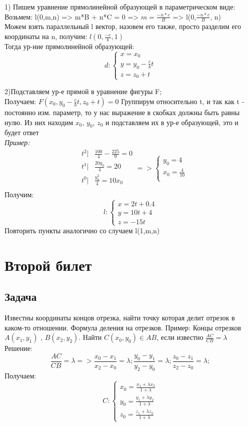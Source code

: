 \documentclass[a4paper,14pt]{extreport} %
\begin{document}
1) Пишем уравнение прямолинейной образующей в параметрическом виде:
Возьмем: l(0,m,n) => m*B + n*C = 0 => $ m = \frac{-n*c}{B} $ => l(0,$\frac{-n*c}{B}$, n)\\ 
Можем взять параллельный l вектор, назовем его также, просто разделим его координаты на n, получим:
$l(0,\frac{-c}{b}, 1)$\\
Тогда ур-ние прямолинейной образующей:
\[
  d:   \begin{cases}
    x = x_0 \\ 
    y = y_0 - \frac{c}{b}t \\ 
    z = z_0 + t
  \end{cases}
\]

2)Подставляем ур-е прямой в уравнение фигуры F; \\
Получаем: $F(x_0, y_0 - \frac{c}{b}t, z_0 + t) = 0$
Группирум относительно t, и так как t - постоянно изм. параметр, то у нас выражение в скобках должны быть равны нулю. 
Из них находим $x_0$, $y_0$, $z_0$ и подставляем их в ур-е образующей, это и будет ответ \\
\textit{Пример:}
\[
\begin{aligned}
  &t^2|   &\frac{100}{4} - \frac{225}{9} = 0\\
  &t^1|   &\frac{20y_0}{4} =20\\
  &t^0|  &\frac{y_0^2}{4} = 10x_0\\
\end{aligned} =>
  \begin{cases}
    y_0=4\\ 
    x_0 = \frac{4}{10}\\
  \end{cases}
\]  
Получим:
\[
  l:\begin{cases}
    x = 2t+0.4\\ 
    y = 10t + 4\\ 
    z = -15t
  \end{cases}
\]
Повторить пункты аналогично со случаем l(1,m,n)

\chapter{Второй билет}

\section*{Задача}
Известны координаты концов отрезка, найти точку которая делит отрезок в каком-то отношении. 
Формула деления на отрезков. 
Пример:
Концы отрезков $ A(x_1, y_1) $ , $ B(x_2, y_2) $. Найти $ C(x_0,y_0) \in AB$, если известно 
$ \frac{AC}{CB} =  \lambda$\\
Решение:\\ 
\[
\frac{AC}{CB} =  \lambda =>
  \frac{x_0 - x_1}{x_2-x_0} = \lambda ; 
  \frac{y_0 - y_1}{y_2-y_0} = \lambda ; 
  \frac{z_0 - z_1}{z_2-z_0} = \lambda ; 
\]
Получаем: 
\[
C: 
\begin{cases}
  x_0 = \frac{x_1+\lambda x_2}{1+\lambda}\\
  y_0 = \frac{y_1+\lambda y_2}{1+\lambda}\\
  z_0 = \frac{z_1+\lambda z_2}{1+\lambda}
\end{cases}
\]
\end{document}
